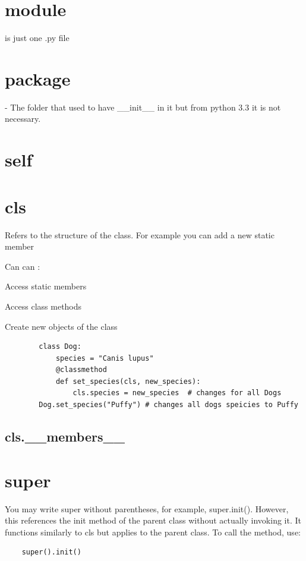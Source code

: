 \section{module}
is just one .py file

\section{package}

- The folder that used to have \_\_init\_\_ in it but from python 3.3 it is not necessary.

\section{self}

\section{cls}

Refers to the structure of the class. For example you can add a new static member

Can can :

Access static members

Access class methods

Create new objects of the class

\begin{verbatim}
        class Dog:
            species = "Canis lupus"
            @classmethod
            def set_species(cls, new_species):
                cls.species = new_species  # changes for all Dogs
        Dog.set_species("Puffy") # changes all dogs speicies to Puffy
\end{verbatim}

\subsection{cls.\_\_members\_\_}

\section{super}
You may write super without parentheses, for example, super.init(). However, this references the init method of the parent class without actually invoking it. It functions similarly to cls but applies to the parent class. To call the method, use:

\begin{verbatim}
    super().init()
\end{verbatim}

